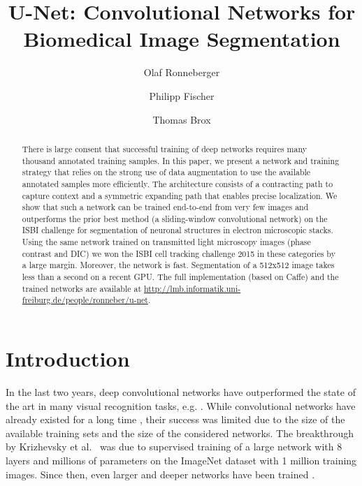 \documentclass{llncs}
\begin{document}
\frontmatter          \pagestyle{headings}  
\mainmatter              \title{U-Net: Convolutional Networks for Biomedical Image Segmentation}
  \author{Olaf Ronneberger \and Philipp Fischer \and Thomas Brox}

 

\maketitle              
\begin{abstract}
There is large consent that successful training of deep networks requires many thousand annotated training samples. In this paper, we present a network and training strategy that relies on the strong use of data augmentation to use the available annotated samples more efficiently. The architecture consists of a contracting path to capture context and a symmetric expanding path that enables precise localization. We show that such a network can be trained end-to-end from very few images and outperforms the prior best method (a sliding-window convolutional network) on the ISBI challenge for segmentation of neuronal structures in electron microscopic stacks. Using the same network trained on transmitted light microscopy images (phase contrast and DIC) we won the ISBI cell tracking challenge 2015 in these categories by a large margin. Moreover, the network is fast. Segmentation of a 512x512 image takes less than a second on a recent GPU. The full implementation (based on Caffe) and the trained networks are available at \href{http://lmb.informatik.uni-freiburg.de/people/ronneber/u-net}{http://lmb.informatik.uni-freiburg.de/people/ronneber/u-net}.
\end{abstract}

\section{Introduction}

In the last two years, deep convolutional networks have outperformed the state of the art in many visual recognition tasks, e.g. \cite{Krizhevsky,R-CNN}. While convolutional networks have already existed for a long time \cite{LeCun_NC1989}, their success was limited due to the size of the available training sets and the size of the considered networks. The breakthrough by Krizhevsky et al.~\cite{Krizhevsky} was due to supervised training of a large network with 8 layers and millions of parameters on the ImageNet dataset with 1 million training images. Since then, even larger and deeper networks have been trained \cite{VGG}.
\end{document}
